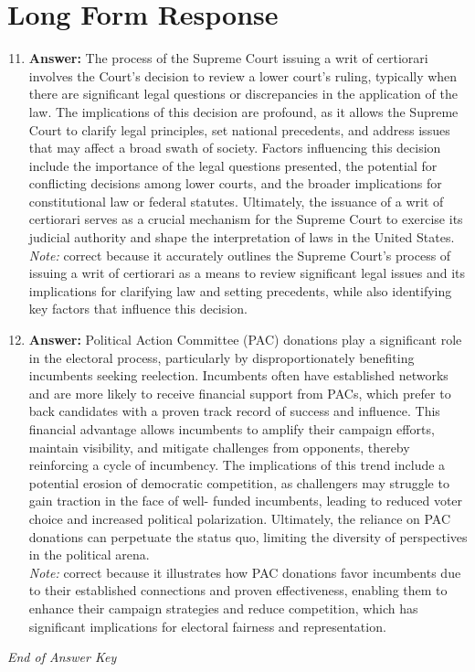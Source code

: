 \documentclass[12pt]{article}
\begin{document}
\section*{Long Form Response}
\begin{enumerate}[label=\arabic*.]
\setcounter{enumi}{10}
\item \textbf{Answer:} The process of the Supreme Court issuing a writ of certiorari involves the Court's decision to review a lower court's ruling, typically when there are significant legal questions or discrepancies in the application of the law. The implications of this decision are profound, as it allows the Supreme Court to clarify legal principles, set national precedents, and address issues that may affect a broad swath of society. Factors influencing this decision include the importance of the legal questions presented, the potential for conflicting decisions among lower courts, and the broader implications for constitutional law or federal statutes. Ultimately, the issuance of a writ of certiorari serves as a crucial mechanism for the Supreme Court to exercise its judicial authority and shape the interpretation of laws in the United States.
\\ \textit{Note:} correct because it accurately outlines the Supreme Court's process of issuing a writ of certiorari as a means to review significant legal issues and its implications for clarifying law and setting precedents, while also identifying key factors that influence this decision.
\item \textbf{Answer:} Political Action Committee (PAC) donations play a significant role in the electoral process, particularly by disproportionately benefiting incumbents seeking reelection. Incumbents often have established networks and are more likely to receive financial support from PACs, which prefer to back candidates with a proven track record of success and influence. This financial advantage allows incumbents to amplify their campaign efforts, maintain visibility, and mitigate challenges from opponents, thereby reinforcing a cycle of incumbency. The implications of this trend include a potential erosion of democratic competition, as challengers may struggle to gain traction in the face of well- funded incumbents, leading to reduced voter choice and increased political polarization. Ultimately, the reliance on PAC donations can perpetuate the status quo, limiting the diversity of perspectives in the political arena.
\\ \textit{Note:} correct because it illustrates how PAC donations favor incumbents due to their established connections and proven effectiveness, enabling them to enhance their campaign strategies and reduce competition, which has significant implications for electoral fairness and representation.
\end{enumerate}

\vfill
\noindent\textit{End of Answer Key}
\end{document}
